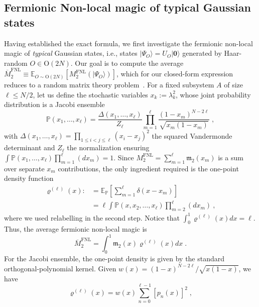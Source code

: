 \documentclass[prx,twocolumn,superscriptaddress,aps,10pt, frontmatterverbose, reprint,footinbib,longbibliography=true]{revtex4-2}
\begin{document}
\subsection{Fermionic Non-local magic of typical Gaussian states}
Having established the exact formula, we first investigate the fermionic non-local magic of \emph{typical} Gaussian states, i.e., states $|\Psi_O\rangle=U_O|\mathbf{0}\rangle$ generated by Haar-random $O\in \mathrm{O}(2N)$.
Our goal is to compute the average $\overline{M}_2^\mathrm{FNL}\equiv \mathbb{E}_{O\sim \mathrm{O}(2N)}[M_2^\mathrm{FNL}(|\Psi_O\rangle)]$, which for our closed-form expression reduces to a random matrix theory problem~\cite{Mehta2004,Livan_2018,vidmar2017entanglement}.
For a fixed subsystem $A$ of size $\ell\le N/2$, let us define the stochastic variables $x_k:=\lambda_k^2$, whose joint probability distribution is a Jacobi ensemble~\cite{Mehta2004}
\begin{equation}
    \mathbb{P}(x_1,\dots,x_\ell) = \frac{\Delta(x_1,\dots,x_\ell)}{Z_\ell}  \prod_{m=1}^\ell \frac{(1-x_m)^{N-2\ell}}{\sqrt{x_m(1-x_m)}}\;,
\end{equation}
with $\Delta(x_1,\dots,x_\ell)=\prod_{1\le i<j\le \ell} (x_i-x_j)^2$ the squared Vandermonde determinant  and $Z_\ell$ the normalization ensuring $\int \mathbb{P}(x_1,\dots,x_\ell)\prod_{m=1}^\ell (dx_m)=1$. 
Since $M_2^\mathrm{FNL}=\sum_{m=1}^\ell \mathfrak{m}_2(x_m)$ is a sum over separate $x_m$ contributions, the only ingredient required is the one-point density function 
\begin{equation}
\begin{split}
    \varrho^{(\ell)}(x):&=\mathbb{E}_\mathbb{P}\left[\sum_{m=1}^\ell \delta(x-x_m)\right] \\&= \ell \int \mathbb{P}(x,x_2,\dots,x_\ell)\prod_{m=2}^\ell (dx_m)\:,
\end{split}
\end{equation}
where we used relabelling in the second step. Notice that $\int_0^1 \varrho^{(\ell)}(x) dx = \ell$.
Thus, the average fermionic non-local magic is 
\begin{equation}
    \overline{M}_2^\mathrm{FNL}=\int_0^1 \mathfrak{m}_2(x) \varrho^{(\ell)}(x) dx\;.
\end{equation}
For the Jacobi ensemble, the one-point density is given by the standard orthogonal-polynomial kernel.
Given $w(x) = (1-x)^{N-2\ell}/\sqrt{x(1-x)}$, we have~\cite{sierant2026theorymatchgatecommutant,sierant2026fermionic}
\begin{equation}
\varrho^{(\ell)}(x) = w(x) \sum_{n=0}^{\ell-1} [p_n(x)]^2\;,
\label{eq:ziopino}
\end{equation}
\end{document}
